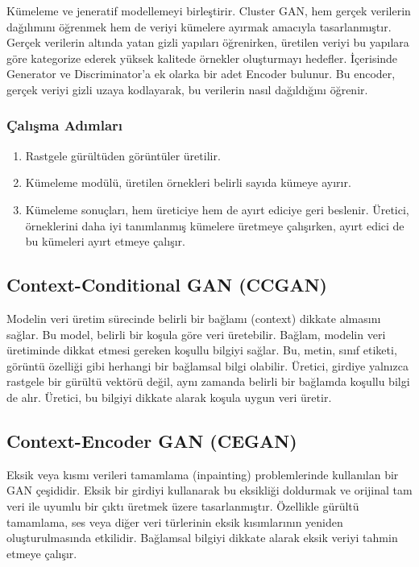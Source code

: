 Kümeleme ve jeneratif modellemeyi birleştirir. Cluster GAN, hem gerçek verilerin dağılımını öğrenmek hem de veriyi kümelere ayırmak amacıyla tasarlanmıştır. Gerçek verilerin altında yatan gizli yapıları öğrenirken, üretilen veriyi bu yapılara göre kategorize ederek yüksek kalitede örnekler oluşturmayı hedefler. İçerisinde Generator ve Discriminator'a ek olarka bir adet Encoder bulunur. Bu encoder, gerçek veriyi gizli uzaya kodlayarak, bu verilerin nasıl dağıldığını öğrenir.

\subsubsection{Çalışma Adımları}

\begin{enumerate}
    \item Rastgele gürültüden görüntüler üretilir.
    \item Kümeleme modülü, üretilen örnekleri belirli sayıda kümeye ayırır.
    \item Kümeleme sonuçları, hem üreticiye hem de ayırt ediciye geri beslenir. Üretici, örneklerini daha iyi tanımlanmış kümelere üretmeye çalışırken, ayırt edici de bu kümeleri ayırt etmeye çalışır.
\end{enumerate}

\subsection{Context-Conditional GAN (CCGAN)}

Modelin veri üretim sürecinde belirli bir bağlamı (context) dikkate almasını sağlar. Bu model, belirli bir koşula göre veri üretebilir. Bağlam, modelin veri üretiminde dikkat etmesi gereken koşullu bilgiyi sağlar. Bu, metin, sınıf etiketi, görüntü özelliği gibi herhangi bir bağlamsal bilgi olabilir. Üretici, girdiye yalnızca rastgele bir gürültü vektörü değil, aynı zamanda belirli bir bağlamda koşullu bilgi de alır. Üretici, bu bilgiyi dikkate alarak koşula uygun veri üretir. 

\subsection{Context-Encoder GAN (CEGAN)}

Eksik veya kısmı verileri tamamlama (inpainting) problemlerinde kullanılan bir GAN çeşididir. Eksik bir girdiyi kullanarak bu eksikliği doldurmak ve orijinal tam veri ile uyumlu bir çıktı üretmek üzere tasarlanmıştır. Özellikle gürültü tamamlama, ses veya diğer veri türlerinin eksik kısımlarının yeniden oluşturulmasında etkilidir. Bağlamsal bilgiyi dikkate alarak eksik veriyi tahmin etmeye çalışır.

